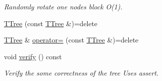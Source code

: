 \begin{DoxyCompactItemize}
\begin{DoxyCompactList}\small\item\em Randomly rotate one node\textquotesingle{}s block O(1). \end{DoxyCompactList}\item 
\hyperlink{classTTree_ad7fb8543e084eea4a24571f3cb979555}{T\+Tree} (const \hyperlink{classTTree}{T\+Tree} \&)=delete
\item 
\hyperlink{classTTree}{T\+Tree} \& \hyperlink{classTTree_a3c4da2361311ac5903822a2151865ae6}{operator=} (const \hyperlink{classTTree}{T\+Tree} \&)=delete
\item 
void \hyperlink{classTTree_a561ca642fa6104a2275c30974b57e221}{verify} () const 
\begin{DoxyCompactList}\small\item\em Verify the some correctness of the tree Uses assert. \end{DoxyCompactList}\end{DoxyCompactItemize}
